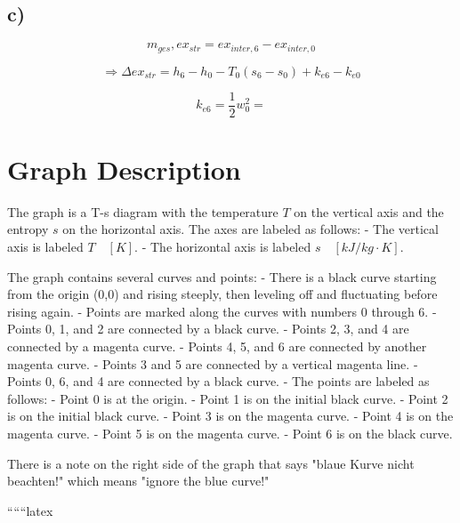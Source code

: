 

\subsection*{c)}
\[
m_{ges}, ex_{str} = ex_{inter,6} - ex_{inter,0}
\]

\[
\Rightarrow \Delta ex_{str} = h_6 - h_0 - T_0 (s_6 - s_0) + k_{e6} - k_{e0}
\]

\[
k_{e6} = \frac{1}{2} w_0^2 =
\]

\newpage

\section*{Graph Description}

The graph is a T-s diagram with the temperature $T$ on the vertical axis and the entropy $s$ on the horizontal axis. The axes are labeled as follows:
- The vertical axis is labeled $T \quad [K]$.
- The horizontal axis is labeled $s \quad [kJ/kg \cdot K]$.

The graph contains several curves and points:
- There is a black curve starting from the origin (0,0) and rising steeply, then leveling off and fluctuating before rising again.
- Points are marked along the curves with numbers 0 through 6.
- Points 0, 1, and 2 are connected by a black curve.
- Points 2, 3, and 4 are connected by a magenta curve.
- Points 4, 5, and 6 are connected by another magenta curve.
- Points 3 and 5 are connected by a vertical magenta line.
- Points 0, 6, and 4 are connected by a black curve.
- The points are labeled as follows:
  - Point 0 is at the origin.
  - Point 1 is on the initial black curve.
  - Point 2 is on the initial black curve.
  - Point 3 is on the magenta curve.
  - Point 4 is on the magenta curve.
  - Point 5 is on the magenta curve.
  - Point 6 is on the black curve.

There is a note on the right side of the graph that says "blaue Kurve nicht beachten!" which means "ignore the blue curve!"

``````latex
